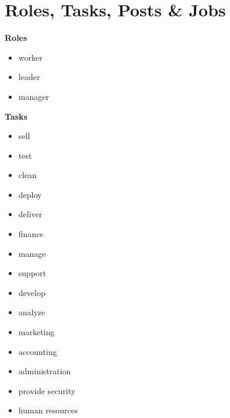 \documentclass[11pt,a4paper]{article}
\begin{document}
\newpage

\section{Roles, Tasks, Posts \& Jobs}

\textbf{Roles}\\[-7.5mm]
\begin{itemize}
    \item worker\\[-7.5mm]
    \item leader\\[-7.5mm]
    \item manager
\end{itemize}

\textbf{Tasks}\\[-7.5mm]
\begin{itemize}
    \item sell\\[-7.5mm]
    \item test\\[-7.5mm]
    \item clean\\[-7.5mm]
    \item deploy\\[-7.5mm]
    \item deliver\\[-7.5mm]
    \item finance\\[-7.5mm]
    \item manage\\[-7.5mm]
    \item support\\[-7.5mm]
    \item develop\\[-7.5mm]
    \item analyze\\[-7.5mm]
    \item marketing\\[-7.5mm]
    \item accounting\\[-7.5mm]
    \item administration\\[-7.5mm]
    \item provide security\\[-7.5mm]
    \item human resources
\end{itemize}
\end{document}
